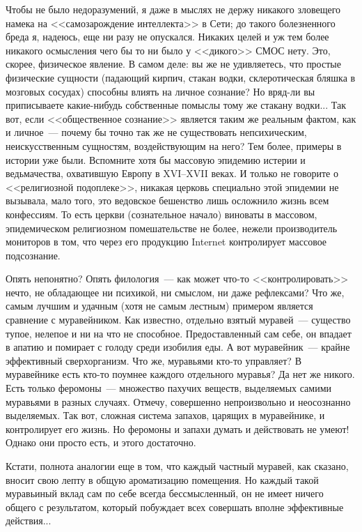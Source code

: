 \documentclass{scrbook}
\newcommand{\flqq}{<<}
\newcommand{\frqq}{>>}
\newcommand{\mdash}{~--- }
\newcommand{\ndash}{--}
\begin{document}
Чтобы не было недоразумений, я даже в мыслях не держу никакого зловещего намека на {\flqq}самозарождение интеллекта{\frqq} в Сети; до такого болезненного бреда я, надеюсь, еще ни разу не опускался. Никаких целей и уж тем более никакого осмысления чего бы то ни было у {\flqq}дикого{\frqq} СМОС нету. Это, скорее, физическое явление. В самом деле: вы же не удивляетесь, что простые физические сущности (падающий кирпич, стакан водки, склеротическая бляшка в мозговых сосудах) способны влиять на личное сознание? Но вряд-ли вы приписываете какие-нибудь собственные помыслы тому же стакану водки... Так вот, если {\flqq}общественное сознание{\frqq} является таким же реальным фактом, как и личное{\mdash}почему бы точно так же не существовать непсихическим, неискусственным сущностям, воздействующим на него? Тем более, примеры в истории уже были. Вспомните хотя бы массовую эпидемию истерии и ведьмачества, охватившую Европу в XVI{\ndash}XVII веках. И только не говорите о {\flqq}религиозной подоплеке{\frqq}, никакая церковь специально этой эпидемии не вызывала, мало того, это ведовское бешенство лишь осложнило жизнь всем конфессиям. То есть церкви (сознательное начало) виноваты в массовом, эпидемическом религиозном помешательстве не более, нежели производитель мониторов в том, что через его продукцию Internet контролирует массовое подсознание.

Опять непонятно? Опять филология{\mdash}как может что-то {\flqq}контролировать{\frqq} нечто, не обладающее ни психикой, ни смыслом, ни даже рефлексами? Что же, самым лучшим и удачным (хотя не самым лестным) примером является сравнение с муравейником. Как известно, отдельно взятый муравей{\mdash}существо тупое, нелепое и ни на что не способное. Предоставленный сам себе, он впадает в апатию и помирает с голоду среди изобилия еды. А вот муравейник{\mdash}крайне эффективный сверхорганизм. Что же, муравьями кто-то управляет? В муравейнике есть кто-то поумнее каждого отдельного муравья? Да нет же никого. Есть только феромоны{\mdash}множество пахучих веществ, выделяемых самими муравьями в разных случаях. Отмечу, совершенно непроизвольно и неосознанно выделяемых. Так вот, сложная система запахов, царящих в муравейнике, и контролирует его жизнь. Но феромоны и запахи думать и действовать не умеют! Однако они просто есть, и этого достаточно.

Кстати, полнота аналогии еще в том, что каждый частный муравей, как сказано, вносит свою лепту в общую ароматизацию помещения. Но каждый такой муравьиный вклад сам по себе всегда бессмысленный, он не имеет ничего общего с результатом, который побуждает всех совершать вполне эффективные действия...
\end{document}
